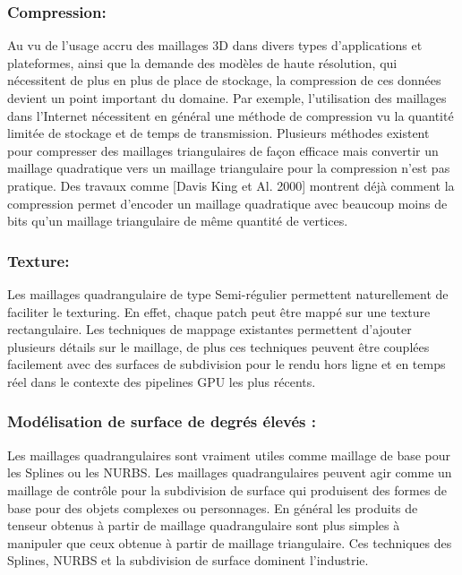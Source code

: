 \documentclass[runningheads]{llncs}
\begin{document}
\subsubsection{Compression:}
Au vu de l’usage accru des maillages 3D dans divers types d’applications et plateformes, ainsi que la demande des modèles de haute résolution, qui nécessitent de plus en plus de place de stockage, la compression de ces données devient un point important du domaine. Par exemple, l’utilisation des maillages dans l’Internet nécessitent en général une méthode de compression vu la quantité limitée de stockage et de temps de transmission. Plusieurs méthodes existent pour compresser des maillages triangulaires de façon efficace mais convertir un maillage quadratique vers un maillage triangulaire pour la compression n’est pas pratique. Des travaux comme [Davis King et Al. 2000]\cite{journals/corr/cs-GR-0005005} montrent déjà comment la compression permet d'encoder un maillage quadratique avec beaucoup moins de bits qu’un maillage triangulaire de même quantité de vertices.

\subsubsection{Texture:}
Les maillages quadrangulaire de type Semi-régulier permettent naturellement de faciliter le texturing. En effet, chaque patch peut être mappé sur une texture rectangulaire. Les techniques de mappage existantes permettent d’ajouter plusieurs détails sur le maillage, de plus ces techniques peuvent être couplées facilement avec des surfaces de subdivision pour le rendu hors ligne et en temps réel dans le contexte des pipelines GPU les plus récents.


\subsubsection{Modélisation de surface de degrés élevés :}

Les maillages quadrangulaires sont vraiment utiles comme maillage de base pour les Splines ou les NURBS. Les maillages quadrangulaires peuvent agir comme un maillage de contrôle pour la subdivision de surface qui produisent des formes de base pour des objets complexes ou personnages. En général les produits de tenseur obtenus à partir de maillage quadrangulaire sont plus simples à manipuler que ceux obtenue à partir de maillage triangulaire. Ces techniques des Splines, NURBS et la subdivision de surface dominent l'industrie. 
\end{document}
